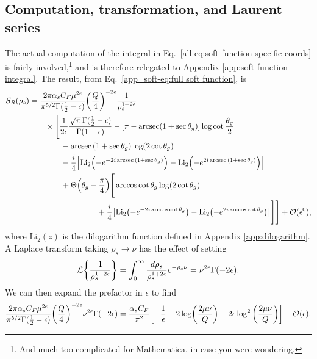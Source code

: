 \documentclass[../thesis.tex]{subfiles}
\providecommand{\Li}{\mathrm{Li}}
\providecommand{\cL}{\mathcal{L}}
\providecommand{\cO}{\mathcal{O}}
\begin{document}
\subsection{Computation, transformation, and Laurent series}
	The actual computation of the integral in Eq.~\ref{all-eq:soft function specific coords} is fairly involved,\footnote{And much too complicated for Mathematica, in case you were wondering.} and is therefore relegated to Appendix \ref{app:soft function integral}. The result, from Eq.~\ref{app_soft-eq:full soft function}, is
	\begin{equation}\label{all-eq:S_R full result rho space}
	\begin{aligned}
		S_R(\rho_s) &= \frac{2\pi\alpha_s C_F\mu^{2\epsilon}}{\pi^{5/2} \Gamma(\frac{1}{2} - \epsilon)}\qty(\frac{Q}{4})^{-2\epsilon} \frac{1}{\rho_s^{1 + 2\epsilon}} \\
			&\qquad\times \Bigg[\frac{1}{2\epsilon}\frac{\sqrt{\pi} \, \Gamma(\frac{1}{2} - \epsilon)}{\Gamma(1 - \epsilon)} - \qty[\pi - \arcsec(1 + \sec\theta_g)]\log\cot\frac{\theta_g}{2} \\
			&\qquad\qquad - \arcsec\qty(1 + \sec\theta_g) \log(2\cot\theta_g) \\
			&\qquad\qquad - \frac{i}{4}\qty[\Li_2\qty(-e^{-2i\arcsec\qty(1 + \sec\theta_g)}) - \Li_2\qty(-e^{2i\arcsec\qty(1 + \sec\theta_g)})] \\
			&\qquad\qquad+ \Theta\qty(\theta_g - \frac{\pi}{4})\Bigg[ \arccos\cot\theta_g \log(2\cot\theta_g) \\
			&\hspace{3cm}+ \frac{i}{4}\qty[\Li_2\qty(-e^{-2i\arccos\cot\theta_g}) - \Li_2\qty(-e^{2i\arccos\cot\theta_g})] \Bigg] \Bigg] + \cO(\epsilon^0),
	\end{aligned}
	\end{equation}
	where $\Li_2(z)$ is the dilogarithm function defined in Appendix \ref{app:dilogarithm}. A Laplace transform taking $\rho_s \to \nu$ has the effect of setting
	\begin{equation}
		\cL\qty{\frac{1}{\rho_s^{1 + 2\epsilon}}} = \int_0^\infty \frac{d\rho_s}{\rho_s^{1 + 2\epsilon}} e^{-\rho_s \nu} = \nu^{2\epsilon}\Gamma(-2\epsilon).
	\end{equation}
	We can then expand the prefactor in $\epsilon$ to find
	\begin{equation}
		\frac{2\pi\alpha_s C_F\mu^{2\epsilon}}{\pi^{5/2} \Gamma(\frac{1}{2} - \epsilon)}\qty(\frac{Q}{4})^{-2\epsilon} \nu^{2\epsilon}\Gamma(-2\epsilon) = \frac{\alpha_s C_F}{\pi^2} \qty[-\frac{1}{\epsilon} - 2\log(\frac{2\mu \nu}{Q}) - 2\epsilon \log^2 \qty(\frac{2\mu\nu}{Q})] + \cO(\epsilon).
	\end{equation}
\end{document}
